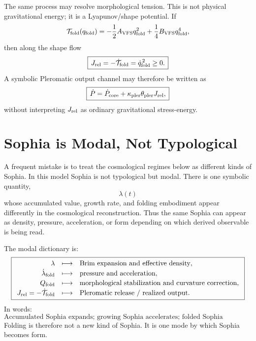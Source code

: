 \documentclass[11pt,a4paper]{article}
\newcommand{\qfold}{q_{\rm fold}}
\newcommand{\Qfold}{Q_{\rm fold}}
\theoremstyle{plain}
\theoremstyle{remark}
\theoremstyle{definition}
\begin{document}
The same process may resolve morphological tension. This is not physical gravitational energy; it is a
Lyapunov/shape potential. If
\[
\mathcal T_{\rm fold}(\qfold)=-\frac12A_{\rm VFS}\qfold^2+\frac14B_{\rm VFS}\qfold^4,
\]
then along the shape flow
\[
\boxed{\,J_{\rm rel}=-\dot{\mathcal T}_{\rm fold}=\dot\qfold^{\,2}\ge0.\,}
\]
A symbolic Pleromatic output channel may therefore be written as
\[
\boxed{\,\dot P=\dot P_{\rm core}+\kappa_{\rm pler}\theta_{\rm pler}J_{\rm rel},\,}
\]
without interpreting $J_{\rm rel}$ as ordinary gravitational stress-energy.


\section{Sophia is Modal, Not Typological}
A frequent mistake is to treat the cosmological regimes below as different kinds of Sophia.  In this
model Sophia is not typological but modal. There is one symbolic quantity,
\[
\boxed{\,\lambda(t)\,}
\]
whose accumulated value, growth rate, and folding embodiment appear differently in the cosmological
reconstruction. Thus the same Sophia can appear as density, pressure, acceleration, or form depending
on which derived observable is being read.

The modal dictionary is:
\[
\boxed{
\begin{array}{rcl}
\lambda &\longmapsto& \text{Brim expansion and effective density},\\[2pt]
\dot\lambda_{\rm fold} &\longmapsto& \text{pressure and acceleration},\\[2pt]
\Qfold &\longmapsto& \text{morphological stabilization and curvature correction},\\[2pt]
J_{\rm rel}=-\dot{\mathcal T}_{\rm fold} &\longmapsto& \text{Pleromatic release / realized output}.
\end{array}}
\]
In words:
\[
\boxed{\text{Accumulated Sophia expands; growing Sophia accelerates; folded Sophia stabilizes.}}
\]
Folding is therefore not a new kind of Sophia. It is one mode by which Sophia becomes form.
\end{document}
